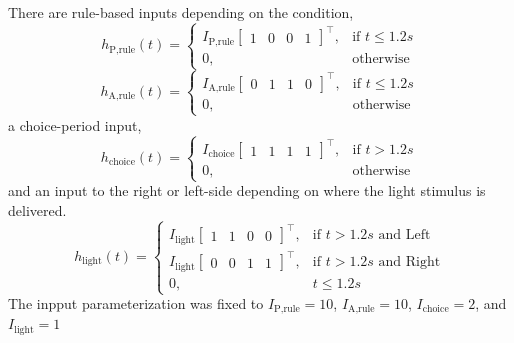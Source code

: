 \documentclass[11pt]{article}
\begin{document}
There are rule-based inputs depending on the condition,
\begin{equation}h_{\text{P,rule}}(t) = \begin{cases}
                           I_{\text{P,rule}} \begin{bmatrix} 1 & 0 & 0 & 1 \end{bmatrix}^\top,& \text{if } t\leq 1.2s \\
                            0,              & \text{otherwise}
                         \end{cases}
\end{equation}
\begin{equation} h_{\text{A,rule}}(t) = \begin{cases}
                           I_{\text{A,rule}} \begin{bmatrix} 0 & 1 & 1 & 0 \end{bmatrix}^\top,& \text{if } t\leq 1.2s \\
                            0,              & \text{otherwise}
                         \end{cases}
\end{equation}
a choice-period input,
\begin{equation} h_{\text{choice}}(t) = \begin{cases}
                           I_{\text{choice}} \begin{bmatrix} 1 & 1 & 1 & 1 \end{bmatrix}^\top,& \text{if } t > 1.2s \\
                            0,              & \text{otherwise}
                         \end{cases}
\end{equation}
and an input to the right or left-side depending on where the light stimulus is delivered.     
\begin{equation}  h_{\text{light}}(t) = \begin{cases}
                           I_{\text{light}} \begin{bmatrix} 1 & 1 & 0 & 0 \end{bmatrix}^\top,& \text{if } t > 1.2s \text{ and Left} \\
                           I_{\text{light}} \begin{bmatrix} 0 & 0 & 1 & 1 \end{bmatrix}^\top,& \text{if } t > 1.2s \text{ and Right} \\
                            0,              & t \leq 1.2s
                         \end{cases} 
\end{equation}
The inpput parameterization was fixed to $I_{\text{P,rule}} = 10 $,  $I_{\text{A,rule}} = 10$,  $I_{\text{choice}} = 2$,  and $I_{\text{light}} = 1$
\end{document}
